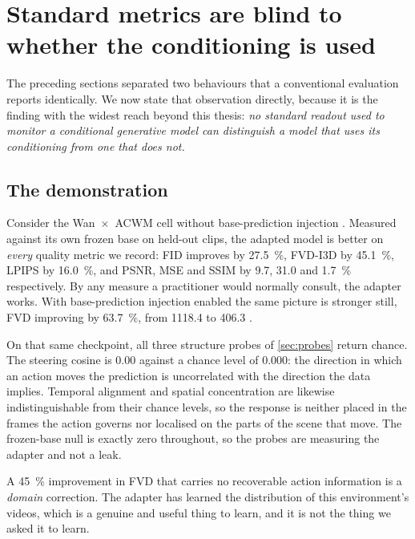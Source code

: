 \section{Standard metrics are blind to whether the conditioning is used}
\label{sec:res-blindness}

The preceding sections separated two behaviours that a conventional
evaluation reports identically. We now state that observation directly,
because it is the finding with the widest reach beyond this thesis: \emph{no
standard readout used to monitor a conditional generative model can
distinguish a model that uses its conditioning from one that does not.}

\subsection{The demonstration}

Consider the Wan~$\times$~ACWM cell without base-prediction injection
. Measured against its own frozen base on held-out
clips, the adapted model is better on \emph{every} quality metric we
record: FID improves by \SI{27.5}{\percent}, FVD-I3D by
\SI{45.1}{\percent}, LPIPS by \SI{16.0}{\percent}, and PSNR, MSE and SSIM by
\num{9.7}, \num{31.0} and \SI{1.7}{\percent} respectively.
By any measure a practitioner would normally consult, the adapter works.
With base-prediction injection enabled the same picture is stronger still,
FVD improving by \SI{63.7}{\percent}, from \num{1118.4} to \num{406.3}
.

On that same checkpoint, all three structure probes of
\cref{sec:probes} return chance. The steering cosine is \num{0.00} against a
chance level of \num{0.000}: the direction in which an action moves the
prediction is uncorrelated with the direction the data implies. Temporal
alignment and spatial concentration are likewise indistinguishable from
their chance levels, so the response is neither placed in the frames the
action governs nor localised on the parts of the scene that move.
The frozen-base null is exactly zero throughout, so the probes are measuring
the adapter and not a leak.

A \SI{45}{\percent} improvement in FVD that carries no recoverable action
information is a \emph{domain} correction. The adapter has learned the
distribution of this environment's videos, which is a genuine and useful
thing to learn, and it is not the thing we asked it to learn.

